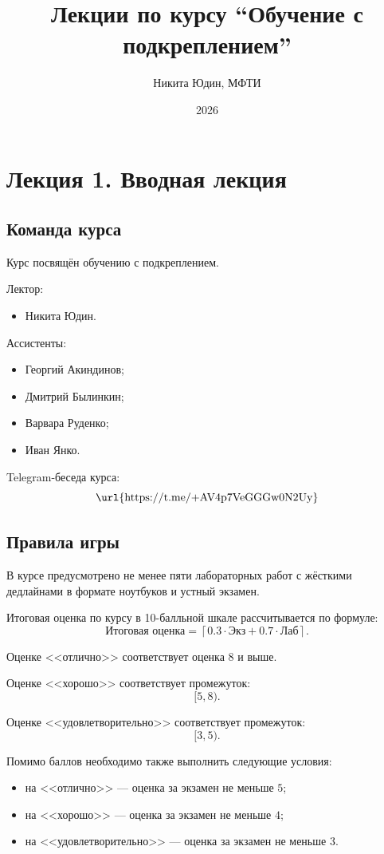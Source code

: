 \documentclass[12pt,a4paper]{article}
\title{Лекции по курсу ``Обучение с подкреплением''}
\author{Никита Юдин, МФТИ}
\date{2026}
\begin{document}
\maketitle
\tableofcontents
\newpage

\section{Лекция 1. Вводная лекция}

\subsection{Команда курса}

Курс посвящён обучению с подкреплением.

Лектор:
\begin{itemize}
    \item Никита Юдин.
\end{itemize}

Ассистенты:
\begin{itemize}
    \item Георгий Акиндинов;
    \item Дмитрий Былинкин;
    \item Варвара Руденко;
    \item Иван Янко.
\end{itemize}

Telegram-беседа курса:
\[
\text{\url{https://t.me/+AV4p7VeGGGw0N2Uy}}
\]

\subsection{Правила игры}

В курсе предусмотрено не менее пяти лабораторных работ с жёсткими дедлайнами в формате ноутбуков и устный экзамен.

Итоговая оценка по курсу в 10-балльной шкале рассчитывается по формуле:
\[
\text{Итоговая оценка}
=
\left\lceil
0.3 \cdot \text{Экз}
+
0.7 \cdot \text{Лаб}
\right\rceil.
\]

Оценке <<отлично>> соответствует оценка $8$ и выше.

Оценке <<хорошо>> соответствует промежуток:
\[
[5,8).
\]

Оценке <<удовлетворительно>> соответствует промежуток:
\[
[3,5).
\]

Помимо баллов необходимо также выполнить следующие условия:
\begin{itemize}
    \item на <<отлично>> --- оценка за экзамен не меньше $5$;
    \item на <<хорошо>> --- оценка за экзамен не меньше $4$;
    \item на <<удовлетворительно>> --- оценка за экзамен не меньше $3$.
\end{itemize}
\end{document}
